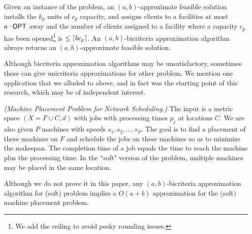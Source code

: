 \begin{definition}
	Given an instance of the \mckc problem, an $(a,b)$-approximate feasible solution installs the $k_p$ units of $c_p$ capacity, and 
	assigns clients to a facilities at most $a\cdot\mathsf{OPT}$ away and the number of clients assigned to a facility where a capacity 
	$c_p$ has been opened\footnote{We add the ceiling to avoid pesky rounding issues.} is $\leq \lceil bc_p\rceil$. An $(a,b)$-bicriteria approximation algorithm always returns an $(a,b)$-approximate feasible solution.
\end{definition}
Although bicriteria approximation algorithms may be unsatisfactory, sometimes these can give unicriteria approximations for other problem.
We mention one application that  we alluded to above, and in fact was the starting point of this research,  which may be of independent interest.
\begin{definition}\emph{(Machine Placement Problem for Network Scheduling.)}\label{def:mpp}
	The input is a metric space $(X=F\cup C,d)$ with jobs with processing times $p_j$ at locations $C$. We are also given $P$ machines with speeds $s_1,s_2,\ldots,s_P$.
	The goal is to find a placement of these machines on $F$ and schedule the jobs on these machines so as to minimize the makespan. The completion time of a job equals the time to reach the machine plus the processing time. In the ``soft" version of the problem, multiple machines may be placed in the same location.
\end{definition}
Although we do not prove it in this paper, any $(a,b)$-bicriteria approximation algorithm for (soft) \mckc problem implies a $O(a+b)$ approximation for the (soft) machine placement problem. 

